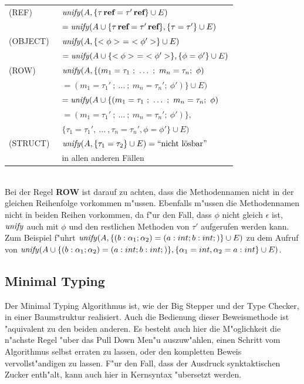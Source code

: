 \begin{tabular}{ll}
  (REF)\      & ${\text{\it unify\/}}(A,\{\tau\,\textbf{ref} = \tau'\,\textbf{ref} \} \cup E)$\\[1mm]
              & \quad $= {\text{\it unify\/}}(A \cup \{\tau\,\textbf{ref} = \tau'\,\textbf{ref} \},
                         \{\tau = \tau' \} \cup E)$\\[3mm]
  (OBJECT)\   & ${\text{\it unify\/}}(A,\{<\phi>\ =\ <\phi'> \} \cup E)$\\[1mm]
              & \quad $= {\text{\it unify\/}}(A \cup \{<\phi>\ =\ <\phi'> \},
                         \{\phi = \phi' \} \cup E)$\\[3mm]
  (ROW)\      & ${\text{\it unify\/}}(A,\{ (m_1 = \tau_1\ ;\ \ldots\ ;\ m_n = \tau_n;\ \phi)$\\
              & \quad $= (m_1 = \tau_1'\ ;\ \ldots\ ;\ m_n = \tau_n';\ \phi') \} \cup E)$\\[1mm]
              & \quad $= {\text{\it unify\/}}(A \cup \{ (m_1 = \tau_1\ ;\ \ldots\ ;\ m_n = \tau_n;\ \phi)$\\
              & \quad \quad $= (m_1 = \tau_1'\ ;\ \ldots\ ;\ m_n = \tau_n';\ \phi') \},$\\
              & \quad \quad \quad $\{\tau_1 = \tau_1', \ \ldots\ ,\tau_n = \tau_n',
                \phi = \phi' \} \cup E)$\\[3mm]
  (STRUCT)\   & ${\text{\it unify\/}}(A,\{\tau_1 = \tau_2\} \cup E) = \mbox{``nicht l\"osbar''}$\\[1mm]
              & in  allen anderen F\"allen
\end{tabular}\\[6mm]
Bei der Regel {\bf ROW} ist darauf zu achten, dass die Methodennamen nicht in der gleichen Reihenfolge
vorkommen m"ussen. Ebenfalls m"ussen die Methodennamen nicht in beiden Reihen vorkommen, da f"ur den Fall, 
dass $\phi$ nicht gleich $\epsilon$ ist, ${\text{\it unify\/}}$ auch mit $\phi$ und den restlichen Methoden von $\tau'$ 
aufgerufen werden kann. Zum Beispiel f"uhrt ${\text{\it unify\/}} (A,\{ (b: \alpha_1 ; \alpha_2) = (a: int ; b: int ;)\}
\cup E)$ zu dem Aufruf von ${\text{\it unify\/}} (A \cup \{ (b: \alpha_1 ; \alpha_2) = (a: int ; b: int ;)\},
\{\alpha_1 = int, \alpha_2 = a: int\} \cup E)$.

\subsection{Minimal Typing}
Der Minimal Typing Algorithmus ist, wie der Big Stepper und der Type Checker, in einer Baumstruktur realisiert.
Auch die Bedienung dieser Beweismethode ist "aquivalent zu den beiden anderen. Es besteht auch hier die M"oglichkeit
die n"achste Regel "uber das Pull Down Men"u auszuw"ahlen, einen Schritt vom Algorithmus selbst erraten zu lassen,
oder den kompletten Beweis vervollst"andigen zu lassen. F"ur den Fall, dass der Ausdruck synktaktischen Zucker 
enth"alt, kann auch hier in Kernsyntax "ubersetzt werden.

